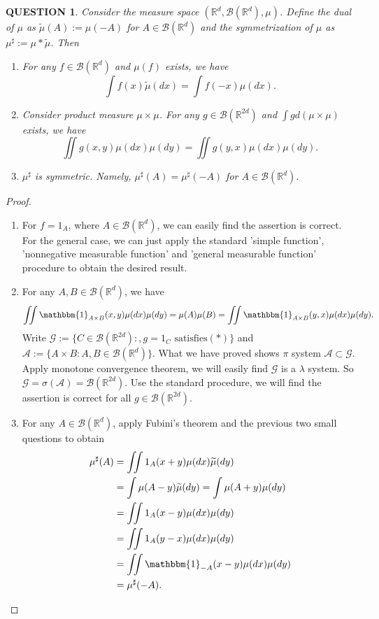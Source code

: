 \documentclass[12pt]{article}
\renewcommand{\b}{\mathscr{B}}
\renewcommand{\(}{\left(}%
\renewcommand{\)}{\right)}%
\renewcommand{\[}{\left[}%
\renewcommand{\]}{\right]}%
\renewcommand{\r}{\mathbb{R}}
\renewcommand{\a}{\mathscr{A}}
\newcommand{\g}{\mathscr{G}}
\newtheorem{question}{QUESTION}[section]}
\newtheorem{proof}{Proof.}}
\begin{document}
   
   \begin{question}
   	Consider the measure space $(\r^d,\b(\r^d),\mu)$. Define the dual of $\mu$ as $\widetilde{\mu}(A):=\mu(-A)$ for $A\in \b(\r^d)$ and the symmetrization of $\mu$ as $\mu^\sharp:=\mu*\widetilde{\mu}$. Then
   	\begin{enumerate}
   		\item For any $f\in\b(\r^d)$ and $\mu(f)$ exists, we have
   		\begin{equation*}
   			\int f(x)\widetilde{\mu}(dx)=\int f(-x)\mu(dx).
   		\end{equation*}
   		\item Consider product measure $\mu\times\mu$. For any $g\in \b(\r^{2d})$ and $\int gd(\mu\times\mu)$ exists, we have
   		\begin{equation*}
   			\iint g(x,y)\mu(dx)\mu(dy)=\iint g(y,x)\mu(dx)\mu(dy).\tag{$*$}
   		\end{equation*}
   		\item $\mu^\sharp$ is symmetric. Namely, $\mu^\sharp(A)=\mu^\sharp(-A)$ for $A\in \b(\r^d)$.
   	\end{enumerate}
   \end{question}
   \begin{proof}
   	\begin{enumerate}
   		\item For $f=1_A$, where $A\in \b(\r^d)$, we can easily find the assertion is correct. For the general case, we can just apply the standard 'simple function', 'nonnegative measurable function' and 'general measurable function' procedure to obtain the desired result.
   		\item For any $A,B\in\b(\r^d)$, we have
   		\begin{equation*}
   			\iint \mathbbm{1}_{A\times B}(x,y)\mu(dx)\mu(dy)=\mu(A)\mu(B)=\iint \mathbbm{1}_{A\times B}(y,x)\mu(dx)\mu(dy).
   		\end{equation*}
   		Write $\g:=\{C\in\b(\r^{2d}):,g=1_C \text{ satisfies} (*)\}$ and $\a:=\{A\times B:A,B\in\b(\r^d)\}$. What we have proved shows $\pi$ system $\a\subset\g$. Apply monotone convergence theorem, we will easily find $\g$ is a $\lambda$ system. So $\g=\sigma(\a)=\b(\r^{2d})$. Use the standard procedure, we will find the assertion is correct for all $g\in\b(\r^{2d})$.
   		\item For any $A\in\b(\r^d)$, apply Fubini's theorem and the previous two small questions to obtain
   		\begin{equation*}
   			\begin{split}
   				\mu^\sharp(A)&=\iint 1_A(x+y)\mu(dx)\widetilde{\mu}(dy)\\
   				&=\int \mu(A-y)\widetilde{\mu}(dy)=\int \mu(A+y)\mu(dy)\\
   				&=\iint 1_A(x-y)\mu(dx)\mu(dy)\\
   				&=\iint 1_A(y-x)\mu(dx)\mu(dy)\\
   				&=\iint \mathbbm{1}_{-A}(x-y)\mu(dx)\mu(dy)\\
   				&=\mu^\sharp(-A).
   			\end{split}
   		\end{equation*}
   	\end{enumerate}
   \end{proof}
   
\end{document}
